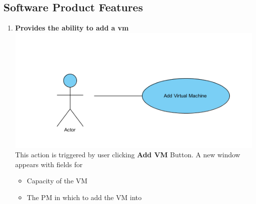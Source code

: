 \documentclass[a4paper,11pt]{article}
\begin{document}
		\subsection{Software Product Features}
			\begin{enumerate}
				\item {\bf Provides the ability to add a vm} \\
				\includegraphics{images/usecase}
				\\This action is triggered by user clicking {\bf Add VM } Button. A new window appears with fields for  
				\begin{itemize}
				 \item Capacity of the VM
				 \item The PM in which to add the VM into
				\end{itemize}
				

\end{enumerate}
\end{document}
